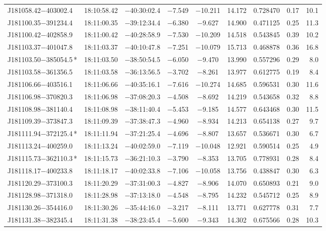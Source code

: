 \begin{table*}
\begin{tabular}{lcccccccr}
J181058.42$-$403002.4 & 18:10:58.42 & $-$40:30:02.4 & $-$7.549 & $-$10.211 & 14.172 & 0.728470 & 0.17 & 10.1 \\
J181100.35$-$391234.4 & 18:11:00.35 & $-$39:12:34.4 & $-$6.380 & $-$9.627 & 14.900 & 0.471125 & 0.25 & 11.3 \\
J181100.42$-$402858.9 & 18:11:00.42 & $-$40:28:58.9 & $-$7.530 & $-$10.209 & 14.518 & 0.543845 & 0.39 & 10.2 \\
J181103.37$-$401047.8 & 18:11:03.37 & $-$40:10:47.8 & $-$7.251 & $-$10.079 & 15.713 & 0.468878 & 0.36 & 16.8 \\
J181103.50$-$385054.5\,* & 18:11:03.50 & $-$38:50:54.5 & $-$6.050 & $-$9.470 & 13.990 & 0.557296 & 0.29 & 8.0 \\
J181103.58$-$361356.5 & 18:11:03.58 & $-$36:13:56.5 & $-$3.702 & $-$8.261 & 13.977 & 0.612775 & 0.19 & 8.4 \\
J181106.66$-$403516.1 & 18:11:06.66 & $-$40:35:16.1 & $-$7.616 & $-$10.274 & 14.685 & 0.596531 & 0.30 & 11.6 \\
J181106.98$-$370820.3 & 18:11:06.98 & $-$37:08:20.3 & $-$4.508 & $-$8.692 & 14.219 & 0.543658 & 0.32 & 8.8 \\
J181108.98$-$381140.4 & 18:11:08.98 & $-$38:11:40.4 & $-$5.453 & $-$9.185 & 14.577 & 0.643468 & 0.30 & 11.5 \\
J181109.39$-$373847.3 & 18:11:09.39 & $-$37:38:47.3 & $-$4.960 & $-$8.934 & 14.213 & 0.654138 & 0.27 & 9.7 \\
J181111.94$-$372125.4\,* & 18:11:11.94 & $-$37:21:25.4 & $-$4.696 & $-$8.807 & 13.657 & 0.536671 & 0.30 & 6.7 \\
J181113.24$-$400259.0 & 18:11:13.24 & $-$40:02:59.0 & $-$7.119 & $-$10.048 & 12.921 & 0.590514 & 0.25 & 4.9 \\
J181115.73$-$362110.3\,* & 18:11:15.73 & $-$36:21:10.3 & $-$3.790 & $-$8.353 & 13.705 & 0.778931 & 0.28 & 8.4 \\
J181118.17$-$400233.8 & 18:11:18.17 & $-$40:02:33.8 & $-$7.106 & $-$10.058 & 13.756 & 0.438847 & 0.30 & 6.3 \\
J181120.29$-$373100.3 & 18:11:20.29 & $-$37:31:00.3 & $-$4.827 & $-$8.906 & 14.070 & 0.650893 & 0.21 & 9.0 \\
J181128.98$-$371318.0 & 18:11:28.98 & $-$37:13:18.0 & $-$4.548 & $-$8.795 & 14.232 & 0.545712 & 0.25 & 8.9 \\
J181130.26$-$354416.0 & 18:11:30.26 & $-$35:44:16.0 & $-$3.217 & $-$8.111 & 13.771 & 0.627778 & 0.31 & 7.7 \\
J181131.38$-$382345.4 & 18:11:31.38 & $-$38:23:45.4 & $-$5.600 & $-$9.343 & 14.302 & 0.675566 & 0.28 & 10.3 \\

\end{tabular}
\end{table*}
